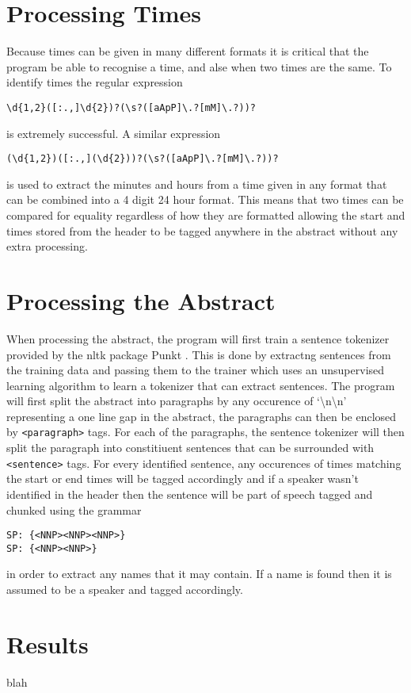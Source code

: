 \documentclass[draft]{article}
\begin{document}
\begin{multicols*}{2}
\section*{Processing Times}
Because times can be given in many different formats it is critical that the program be able to recognise a time, and alse when two times are the same. To identify times the regular expression 
\begin{verbatim}
\d{1,2}([:.,]\d{2})?(\s?([aApP]\.?[mM]\.?))?
\end{verbatim} is extremely successful. A similar expression
\begin{verbatim}
(\d{1,2})([:.,](\d{2}))?(\s?([aApP]\.?[mM]\.?))?
\end{verbatim} is used to extract the minutes and hours from a time given in any format that can be combined into a 4 digit 24 hour format. This means that two times can be compared for equality regardless of how they are formatted allowing the start and times stored from the header to be tagged anywhere in the abstract without any extra processing.

\section*{Processing the Abstract}
When processing the abstract, the program will first train a sentence tokenizer provided by the nltk package Punkt \citep{senttok}. This is done by extractng sentences from the training data and passing them to the trainer which uses an unsupervised learning algorithm \citep{compling} to learn a tokenizer that can extract sentences. The program will first split the abstract into paragraphs by any occurence of `\textbackslash n\textbackslash n' representing a one line gap in the abstract, the paragraphs can then be enclosed by \texttt{<paragraph>} tags. For each of the paragraphs, the sentence tokenizer will then split the paragraph into constitiuent sentences that can be surrounded with \texttt{<sentence>} tags. For every identified sentence, any occurences of times matching the start or end times will be tagged accordingly and if a speaker wasn't identified in the header then the sentence will be part of speech tagged and chunked using the grammar
\begin{verbatim}
SP: {<NNP><NNP><NNP>}
SP: {<NNP><NNP>}
\end{verbatim} 
in order to extract any names that it may contain. If a name is found then it is assumed to be a speaker and tagged accordingly.

\section*{Results}
blah




\end{multicols*}
\end{document}
